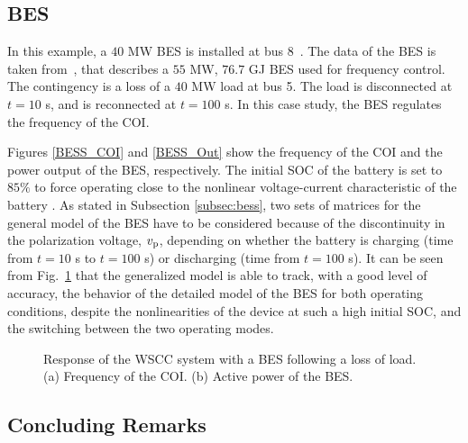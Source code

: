 \documentclass[journal, a4paper]{IEEEtran}
\begin{document}
\vspace{-2mm}

\subsection{BES}
\label{subsec:bessTDS}

In this example, a $40$ MW BES is installed at bus 8~\cite{shepherd:65}.
The data of the BES is taken from~\cite{mercier:09}, 
that describes a $55$ MW, $76.7$ GJ BES used for frequency control.
The contingency is a loss of a $40$
MW load at bus 5.  The load is disconnected at $t = 10$ s, and is
reconnected at $t = 100$ s.  In this case study, the BES regulates the
frequency of the COI.

Figures \ref{BESS_COI} and \ref{BESS_Out} show the frequency of the
COI and the power output of the BES, respectively. The initial
  SOC of the battery is set to $85\%$ to force operating close to the
  nonlinear voltage-current characteristic of the battery
  \cite{tremblay:07, shepherd:65}.  
As stated in Subsection
\ref{subsec:bess}, two sets of matrices for the general model 
of the BES have to be considered
because of the discontinuity in the polarization voltage, $v_{\rm p}$,
depending on whether the battery is charging (time from $t = 10$ s to $t = 100$ s)
or discharging (time from $t = 100$ s). It can be seen from Fig.~\ref{BESScasestudy}
that the generalized model is able to track, with a good level of accuracy, 
the behavior of the detailed model of the BES for both operating conditions, despite
the nonlinearities of the device at such a high initial SOC, and the switching
between the two operating modes.

\begin{figure}[t!]
  \centering
  \vspace{-0.4cm}
  \caption{Response of the WSCC system with a BES following a loss of
    load. (a) Frequency of the COI. (b) Active power of the
    BES.} \label{BESScasestudy}
\end{figure}


\subsection{Concluding Remarks}
\label{sec:remarks}
\end{document}
